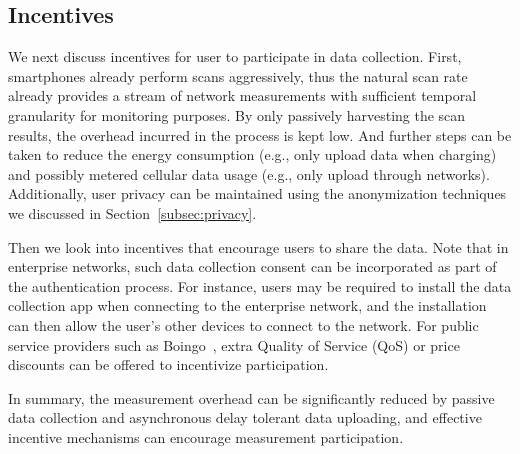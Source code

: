 \subsection{Incentives}
\label{subsec:incentive}

We next discuss incentives for user to participate in data collection. First, smartphones already perform \wifi{}
scans aggressively, thus the natural scan rate already provides a stream of
network measurements with sufficient temporal granularity for monitoring
purposes. By only passively harvesting the scan results, the overhead incurred
in the process is kept low. And further steps can be taken to reduce the energy
consumption (e.g., only upload data when charging) and possibly metered cellular
data usage (e.g., only upload through \wifi{} networks).  Additionally, user
privacy can be maintained using the anonymization techniques we discussed in
Section~\ref{subsec:privacy}.

Then we look into incentives that encourage users to share the data. Note that
in enterprise networks, such data collection consent can be incorporated as part
of the authentication process. For instance, users may be required to install
the data collection app when connecting to the enterprise network, and the
installation can then allow the user's other devices to connect to the network.
For public \wifi{} service providers such as Boingo~\cite{boingo}, extra Quality
of Service (QoS) or price discounts can be offered to incentivize
participation.

In summary, the measurement overhead can be significantly reduced by passive
data collection and asynchronous delay tolerant data uploading, and effective
incentive mechanisms can encourage measurement participation.

